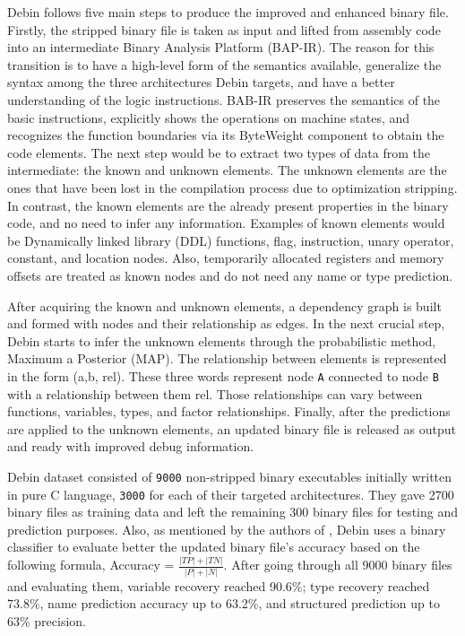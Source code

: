 \documentclass[conference,a4paper]{IEEEtran}
\begin{document}
Debin follows five main steps to produce the improved and enhanced binary file. Firstly, the stripped binary file is taken as input and lifted from assembly code into an intermediate Binary Analysis Platform (BAP-IR). The reason for this transition is to have a high-level form of the semantics available, generalize the
syntax among the three architectures Debin targets, and have a better understanding of the logic instructions. BAB-IR preserves the semantics of the basic instructions, explicitly shows the operations on machine states, and recognizes the function boundaries via its ByteWeight component to obtain the code elements.
The next step would be to extract two types of data from the intermediate: the known and unknown elements. The unknown elements are the ones that have been lost in the compilation process due to optimization stripping. In contrast, the known elements are the already present properties in the binary
code, and no need to infer any information. Examples of known elements would be Dynamically linked library (DDL) functions, flag, instruction, unary operator, constant, and location nodes. Also, temporarily allocated registers and memory offsets are treated as known nodes and do not need any name or type prediction.

After acquiring the known and unknown elements, a dependency graph is built and formed with nodes and their relationship as edges.
In the next crucial step, Debin starts to infer the unknown elements through the probabilistic method, Maximum a Posterior (MAP). The relationship between elements is represented in the form (a,b, rel). These three words represent node \verb|A| connected to node \verb|B| with a relationship between them rel. Those relationships can vary between functions, variables, types, and factor relationships.
Finally, after the predictions are applied to the unknown elements, an updated binary file is released as output and ready with improved debug information.

Debin dataset consisted of \verb|9000| non-stripped binary executables initially written in pure C language, \verb|3000| for each of their targeted architectures. They gave 2700 binary files as training data and left the remaining 300 binary files for testing and prediction purposes.
Also, as mentioned by the authors of \cite{noauthor_debin_nodate}, Debin uses a binary classifier to evaluate better the updated binary file's accuracy based on the following formula, Accuracy = ${\frac{|TP|+|TN|}{|P|+|N|}}$. After going through all 9000 binary files and evaluating them, variable recovery reached 90.6\%; type recovery reached 73.8\%, name prediction accuracy up to 63.2\%, and structured prediction up to 63\% precision.
\end{document}
